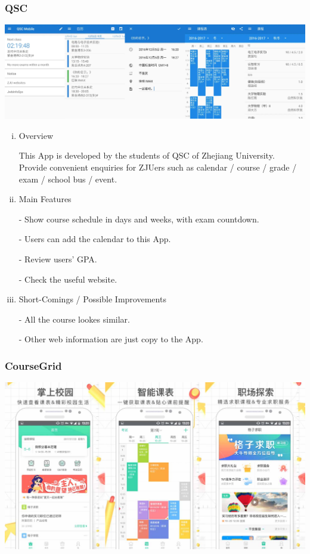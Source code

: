 \documentclass{article}
\begin{document}
    \subsubsection{QSC}
    \begin{center}
        \includegraphics[width=6.9in]{QSC}
    \end{center}
    \begin{enumerate}[i)]
    \item Overview
        
    This App is developed by the students of QSC of Zhejiang University. 
    Provide convenient enquiries for ZJUers 
    such as calendar / course / grade / exam / school bus / event.

    \item Main Features

    - Show course schedule in days and weeks, with exam countdown.

    - Users can add the calendar to this App.

    - Review users' GPA.

    - Check the useful website.

    \item Short-Comings / Possible Improvements
    
    - All the course lookes similar.

    - Other web information are just copy to the App.



    \end{enumerate}
    

    \subsubsection{CourseGrid}
    \begin{center}
        \includegraphics[width=6.5in]{CourseGrid}
    \end{center}
\end{document}
